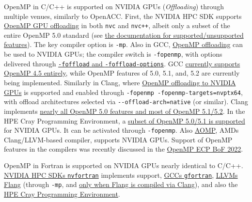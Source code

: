  OpenMP in C/C++ is supported on NVIDIA GPUs (\emph{Offloading}) through multiple venues, similarly to OpenACC. First, the NVIDIA HPC SDK supports \href{https://docs.nvidia.com/hpc-sdk/compilers/hpc-compilers-user-guide/index.html\#openmp-use}{OpenMP GPU offloading} in both \texttt{nvc} and \texttt{nvc++}, albeit only a subset of the entire OpenMP 5.0 standard (see \href{https://docs.nvidia.com/hpc-sdk/compilers/hpc-compilers-user-guide/index.html\#openmp-subset}{the documentation for supported/unsupported features}). The key compiler option is \texttt{-mp}. Also in GCC, \href{https://gcc.gnu.org/wiki/Offloading}{OpenMP offloading} can be used to NVIDIA GPUs; the compiler switch is \texttt{-fopenmp}, with options delivered through \href{https://gcc.gnu.org/onlinedocs/gcc/C-Dialect-Options.html\#index-foffload}{\texttt{-foffload} and \texttt{-foffload-options}}. GCC \href{https://gcc.gnu.org/onlinedocs/gcc-13.1.0/libgomp/OpenMP-Implementation-Status.html}{currently supports OpenMP 4.5 entirely}, while OpenMP features of 5.0, 5.1, and, 5.2 are currently being implemented. Similarly in Clang, where \href{https://clang.llvm.org/docs/OffloadingDesign.html}{OpenMP offloading to NVIDIA GPUs} is supported and enabled through \texttt{-fopenmp\ -fopenmp-targets=nvptx64}, with offload architectures selected via \texttt{-\/-offload-arch=native} (or similar). Clang implements \href{https://clang.llvm.org/docs/OpenMPSupport.html\#openmp-implementation-details}{nearly all OpenMP 5.0 features and most of OpenMP 5.1/5.2}. In the HPE Cray Programming Environment, a \href{https://cpe.ext.hpe.com/docs/cce/man7/intro_openmp.7.html}{subset of OpenMP 5.0/5.1 is supported} for NVIDIA GPUs. It can be activated through \texttt{-fopenmp}. Also \href{https://github.com/ROCm-Developer-Tools/aomp/}{AOMP}, AMD\textquotesingle s Clang/LLVM-based compiler, supports NVIDIA GPUs. Support of OpenMP features in the compilers was recently discussed in the \href{https://www.openmp.org/wp-content/uploads/2022_ECP_Community_BoF_Days-OpenMP_RoadMap_BoF.pdf}{OpenMP ECP BoF 2022}.   

 OpenMP in Fortran is supported on NVIDIA GPUs nearly identical to C/C++. \href{https://docs.nvidia.com/hpc-sdk/compilers/hpc-compilers-user-guide/index.html\#openmp-use}{NVIDIA HPC SDK\textquotesingle s \texttt{nvfortran}} implements support, \href{https://gcc.gnu.org/wiki/openmp}{GCC\textquotesingle s \texttt{gfortran}}, \href{https://flang.llvm.org/docs/}{LLVM\textquotesingle s Flang} (through \texttt{-mp}, and \href{https://flang.llvm.org/docs/GettingStarted.html\#openmp-target-offload-build}{only when Flang is compiled via Clang}), and also the \href{https://cpe.ext.hpe.com/docs/cce/man7/intro_openmp.7.html}{HPE Cray Programming Environment}.   


